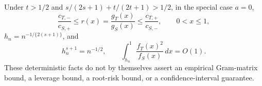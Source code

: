 Under \(t>1/2\) and \(s/(2s+1)+t/(2t+1)>1/2\), in the special case \(a=0\),
\[
\frac{c_{T,-}}{c_{S,+}}\le r(x)=\frac{g_T(x)}{g_S(x)}\le\frac{c_{T,+}}{c_{S,-}},\qquad 0<x\le1,
\]
\(h_n=n^{-1/\{2(s+1)\}}\), and
\[
h_n^{s+1}=n^{-1/2},\qquad \int_{h_n}^1\frac{f_T(x)^2}{f_S(x)}\,dx=O(1).
\]
These deterministic facts do not by themselves assert an empirical Gram-matrix bound, a leverage bound, a root-risk bound, or a confidence-interval guarantee.